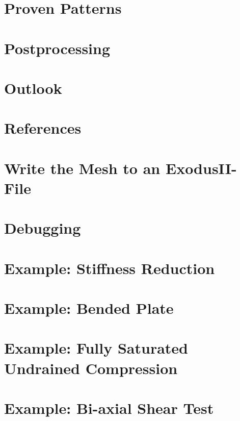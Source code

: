 \documentclass[12pt,a4paper]{report}
\begin{document}
\chapter{Proven Patterns}
\label{chap:patterns}


\chapter{Postprocessing}
\label{chap:postprocessing}


\chapter{Outlook}
\label{chap:outlook}


\chapter{References}
\label{chap:references}


\begin{appendices}

    \chapter{Write the Mesh to an ExodusII-File}
    \label{app:mesh-to-exodus}
    

    \chapter{Debugging}
    \label{app:debugging}
    

    \chapter{Example: Stiffness Reduction}
    \label{app:stiffness-reduction}
    

    \chapter{Example: Bended Plate}
    \label{app:bended-plate}
    

    \chapter{Example: Fully Saturated Undrained Compression}
    \label{app:fully-saturated-undrained-compression}
    

    \chapter{Example: Bi-axial Shear Test}
    \label{app:bi-axial-shear}
    

\end{appendices}
\end{document}
